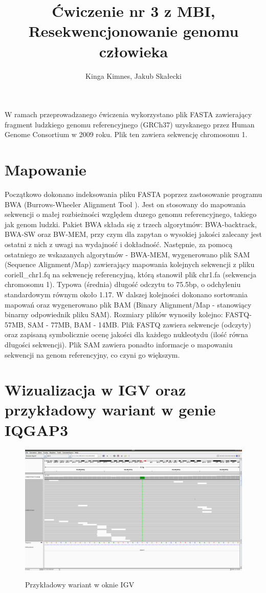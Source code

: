 \documentclass[a4paper]{article}
\begin{document}
\title{Ćwiczenie nr 3 z MBI, Resekwencjonowanie genomu człowieka}
\author{Kinga Kimnes, Jakub Skałecki}
\maketitle

W ramach przeprowadzanego ćwiczenia wykorzystano plik FASTA zawierający fragment ludzkiego genomu referencyjnego (GRCh37) uzyskanego przez Human Genome Consortium w 2009 roku. Plik ten zawiera sekwencję chromosomu 1.

\section{Mapowanie}

Początkowo dokonano indeksowania pliku FASTA poprzez zastosowanie programu BWA (Burrows-Wheeler Alignment Tool ). 
Jest on stosowany do mapowania sekwencji o małej rozbieżności względem duzego genomu referencyjnego, takiego jak genom ludzki.
Pakiet BWA składa się z trzech algorytmów: BWA-backtrack, BWA-SW oraz BW-MEM, przy czym dla zapytan o wysokiej jakości zalecany jest ostatni z nich z uwagi na wydajność i dokładność.
Następnie, za pomocą ostatniego ze wskazanych algorytmów - BWA-MEM, wygenerowano plik SAM (Sequence Alignment/Map) zawierający mapowania kolejnych sekwencji z pliku coriell\_chr1.fq na sekwencję referencyjną, którą stanowił plik chr1.fa (sekwencja chromosomu 1).
Typowa (średnia) długość odczytu to 75.5bp, o odchyleniu standardowym równym około 1.17.
W dalszej kolejności dokonano sortowania mapowań oraz wygenerowano plik BAM (Binary Alignment/Map - stanowiący binarny odpowiednik pliku SAM). Rozmiary plików wynosiły kolejno: FASTQ-57MB, SAM - 77MB, BAM - 14MB.
Plik FASTQ zawiera sekwencje (odczyty) oraz zapisaną symbolicznie ocenę jakości dla każdego nukleotydu (ilość równa długości sekwencji). Plik SAM zawiera ponadto informacje o mapowaniu sekwencji na genom referencyjny, co czyni go większym.

\section{Wizualizacja w IGV oraz przykładowy wariant w genie IQGAP3}  


\begin{figure}[h]
    \centering
    \includegraphics[width=1.0\textwidth]{vcf.png}
    \label{fig:igv}
    \caption[]{Przykładowy wariant w oknie IGV}
\end{figure}
\end{document}

